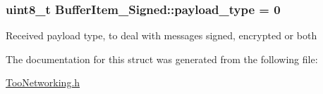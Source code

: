 \subsubsection[{\texorpdfstring{payload\+\_\+type}{payload_type}}]{\setlength{\rightskip}{0pt plus 5cm}uint8\+\_\+t Buffer\+Item\+\_\+\+Signed\+::payload\+\_\+type = 0}\hypertarget{structBufferItem__Signed_a75a67331ae70b15b59ba8941313e4fce}{}\label{structBufferItem__Signed_a75a67331ae70b15b59ba8941313e4fce}
Received payload type, to deal with messages signed, encrypted or both 

The documentation for this struct was generated from the following file\+:\begin{DoxyCompactItemize}
\item 
\hyperlink{TooNetworking_8h}{Too\+Networking.\+h}\end{DoxyCompactItemize}
